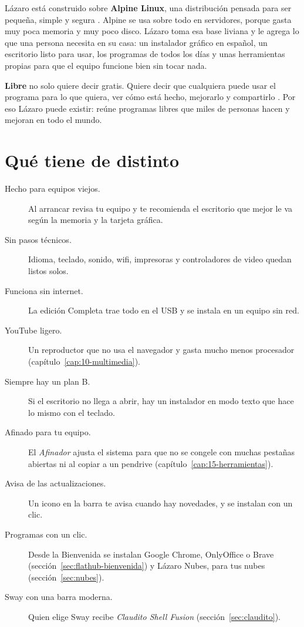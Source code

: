 Lázaro está construido sobre \textbf{Alpine Linux}, una distribución
pensada para ser pequeña, simple y segura \cite{alpine-about}. Alpine se
usa sobre todo en servidores, porque gasta muy poca memoria y muy poco
disco. Lázaro toma esa base liviana y le agrega lo que una persona
necesita en su casa: un instalador gráfico en español, un escritorio listo
para usar, los programas de todos los días y unas herramientas propias para
que el equipo funcione bien sin tocar nada.

\begin{nota}
\textbf{Libre} no solo quiere decir gratis. Quiere decir que cualquiera
puede usar el programa para lo que quiera, ver cómo está hecho, mejorarlo
y compartirlo \cite{fsf-software-libre}. Por eso Lázaro puede existir:
reúne programas libres que miles de personas hacen y mejoran en todo el
mundo.
\end{nota}

\section{Qué tiene de distinto}

\begin{description}
  \item[Hecho para equipos viejos.] Al arrancar revisa tu equipo y te
    recomienda el escritorio que mejor le va según la memoria y la tarjeta
    gráfica.
  \item[Sin pasos técnicos.] Idioma, teclado, sonido, wifi, impresoras y
    controladores de video quedan listos solos.
  \item[Funciona sin internet.] La edición Completa trae todo en el USB y
    se instala en un equipo sin red.
  \item[YouTube ligero.] Un reproductor que no usa el navegador y gasta
    mucho menos procesador (capítulo~\ref{cap:10-multimedia}).
  \item[Siempre hay un plan B.] Si el escritorio no llega a abrir, hay un
    instalador en modo texto que hace lo mismo con el teclado.
  \item[Afinado para tu equipo.] El \emph{Afinador} ajusta el sistema para
    que no se congele con muchas pestañas abiertas ni al copiar a un
    pendrive (capítulo~\ref{cap:15-herramientas}).
  \item[Avisa de las actualizaciones.] Un icono en la barra te avisa cuando
    hay novedades, y se instalan con un clic.
  \item[Programas con un clic.] Desde la Bienvenida se instalan Google
    Chrome, OnlyOffice o Brave (sección~\ref{sec:flathub-bienvenida}) y
    Lázaro Nubes, para tus nubes (sección~\ref{sec:nubes}).
  \item[Sway con una barra moderna.] Quien elige Sway recibe
    \emph{Claudito Shell Fusion} (sección~\ref{sec:claudito}).
\end{description}

